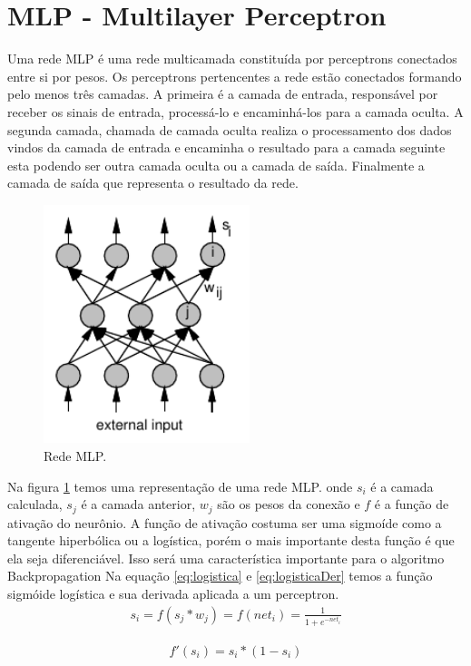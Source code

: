 \documentclass[
	article,			%
	11pt,				%
	oneside,			%
	a4paper,			%
	english,			%
	brazil,				%
	sumario=tradicional
	]{abntex2}
\begin{document}
\section*{MLP - Multilayer Perceptron}

Uma rede MLP é uma rede multicamada constituída por perceptrons conectados
entre si por pesos. Os perceptrons pertencentes a rede estão conectados formando
pelo menos três camadas. A primeira é a camada de entrada, responsável por
receber os sinais de entrada, processá-lo e encaminhá-los para a camada oculta.
A segunda camada, chamada de camada oculta realiza o processamento dos dados
vindos da camada de entrada e encaminha o resultado para a camada seguinte esta
podendo ser outra camada oculta ou a camada de saída. Finalmente a camada de
saída que representa o resultado da rede. 

\begin{figure}[!htb]
	\centering
	\includegraphics[width=6cm]{imagens/mlp.png}
	\caption{Rede MLP.}
	\label{fig:digraph}
\end{figure}

Na figura \ref{fig:digraph} temos uma representação de uma rede MLP.
onde $s_i$ é a camada calculada, $s_j$ é a camada anterior, $w_j$ são os pesos
da conexão e $f$ é a função de ativação do neurônio. A função de ativação
costuma ser uma sigmoíde como a tangente hiperbólica ou a logística, porém o
mais importante desta função é que ela seja diferenciável. Isso será uma
característica importante para o algoritmo Backpropagation Na equação
\ref{eq:logistica} e \ref{eq:logisticaDer} temos a função sigmóide logística e
sua derivada aplicada a um perceptron.
\begin{align}
	s_i=f(s_j*w_j)=f(net_i)=\frac{1}{1+e^{-net_i}}
\label{eq:logistica}
\end{align}

\begin{align}
	f'(s_i)=s_i*(1-s_i)
\label{eq:logisticaDer}
\end{align} 
\end{document}
